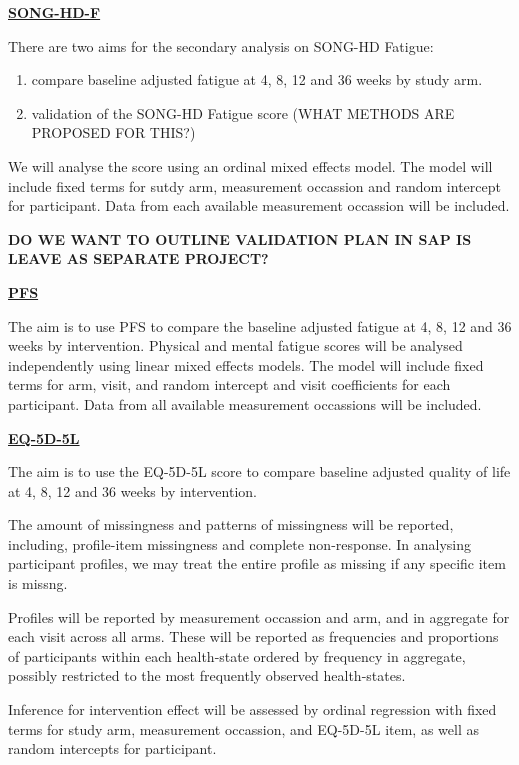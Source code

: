 \documentclass[
]{article}
\providecommand{\tightlist}{%
  \setlength{\itemsep}{0pt}\setlength{\parskip}{0pt}}
\begin{document}
\label{analysis:song-hd-f}
\hyperref[outcome:song-hd-f]{\textbf{SONG-HD-F}}

There are two aims for the secondary analysis on SONG-HD Fatigue:

\begin{enumerate}
  \tightlist
  \item compare baseline adjusted fatigue at 4, 8, 12 and 36 weeks by study arm.
  \item validation of the SONG-HD Fatigue score (WHAT METHODS ARE PROPOSED FOR THIS?)
\end{enumerate}

We will analyse the score using an ordinal mixed effects model.
The model will include fixed terms for sutdy arm, measurement occassion and random intercept for participant.
Data from each available measurement occassion will be included.

\textbf{DO WE WANT TO OUTLINE VALIDATION PLAN IN SAP IS LEAVE AS SEPARATE PROJECT?}

\label{analysis:pfs}
\hyperref[outcome:pfs]{\textbf{PFS}}

The aim is to use PFS to compare the baseline adjusted fatigue at 4, 8, 12 and 36 weeks by intervention.
Physical and mental fatigue scores will be analysed independently using linear mixed effects models.
The model will include fixed terms for arm, visit, and random intercept and visit coefficients for each participant.
Data from all available measurement occassions will be included.


\label{analysis:eq5d5l}
\hyperref[outcome:eq5d5l]{\textbf{EQ-5D-5L}}

The aim is to use the EQ-5D-5L score to compare baseline adjusted quality of life at 4, 8, 12 and 36 weeks by intervention.

The amount of missingness and patterns of missingness will be reported, including, profile-item missingness and complete non-response.
In analysing participant profiles, we may treat the entire profile as missing if any specific item is missng.

Profiles will be reported by measurement occassion and arm, and in aggregate for each visit across all arms.
These will be reported as frequencies and proportions of participants within each health-state ordered by frequency in aggregate, possibly restricted to the most frequently observed health-states.

Inference for intervention effect will be assessed by ordinal regression with fixed terms for study arm, measurement occassion, and EQ-5D-5L item, as well as random intercepts for participant.
\end{document}
